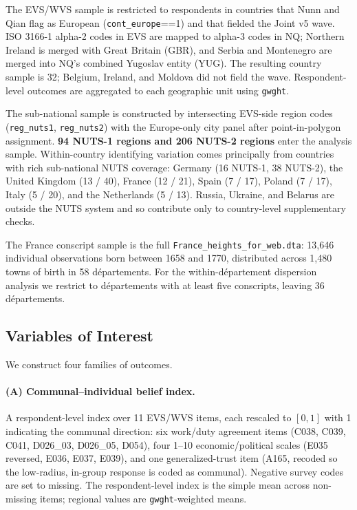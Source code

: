The EVS/WVS sample is restricted to respondents in countries that Nunn and Qian flag as European (\texttt{cont\_europe}==1) and that fielded the Joint v5 wave. ISO 3166-1 alpha-2 codes in EVS are mapped to alpha-3 codes in NQ; Northern Ireland is merged with Great Britain (GBR), and Serbia and Montenegro are merged into NQ's combined Yugoslav entity (YUG). The resulting country sample is 32; Belgium, Ireland, and Moldova did not field the wave. Respondent-level outcomes are aggregated to each geographic unit using \texttt{gwght}.

The sub-national sample is constructed by intersecting EVS-side region codes (\texttt{reg\_nuts1}, \texttt{reg\_nuts2}) with the Europe-only city panel after point-in-polygon assignment. \textbf{94 NUTS-1 regions and 206 NUTS-2 regions} enter the analysis sample. Within-country identifying variation comes principally from countries with rich sub-national NUTS coverage: Germany (16 NUTS-1, 38 NUTS-2), the United Kingdom (13 / 40), France (12 / 21), Spain (7 / 17), Poland (7 / 17), Italy (5 / 20), and the Netherlands (5 / 13). Russia, Ukraine, and Belarus are outside the NUTS system and so contribute only to country-level supplementary checks.

The France conscript sample is the full \texttt{France\_heights\_for\_web.dta}: 13{,}646 individual observations born between 1658 and 1770, distributed across 1{,}480 towns of birth in 58 départements. For the within-département dispersion analysis we restrict to départements with at least five conscripts, leaving 36 départements.

\subsection{Variables of Interest}

We construct four families of outcomes.

\paragraph{(A) Communal--individual belief index.} A respondent-level index over 11 EVS/WVS items, each rescaled to $[0,1]$ with 1 indicating the communal direction: six work/duty agreement items (C038, C039, C041, D026\_03, D026\_05, D054), four 1--10 economic/political scales (E035 reversed, E036, E037, E039), and one generalized-trust item (A165, recoded so the low-radius, in-group response is coded as communal). Negative survey codes are set to missing. The respondent-level index is the simple mean across non-missing items; regional values are \texttt{gwght}-weighted means.

